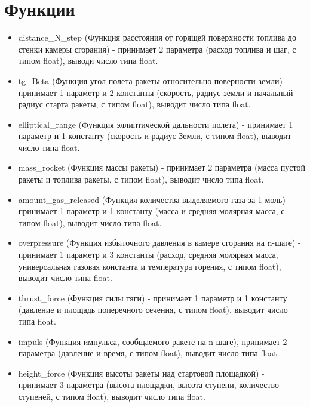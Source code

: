 \documentclass[a4paper, 12pt]{report}
\begin{document}
\section{Функции}
\begin{itemize}
    \item distance\_N\_step (Функция расстояния от горящей поверхности топлива до стенки камеры сгорания) - принимает 2 параметра (расход топлива и шаг, с типом float), выводи число типа float.
    \item tg\_Beta (Функция угол полета ракеты относительно поверности земли) - принимает 1 параметр и 2 константы (скорость, радиус земли и начальный радиус старта ракеты, с типом float), выводит число типа float.
    \item elliptical\_range (Функция эллиптической дальности полета) - принимает 1 параметр и 1 константу (скорость и радиус Земли, с типом float), выводит число типа float.
    \item mass\_rocket (Функция массы ракеты) - принимает 2 параметра (масса пустой ракеты и топлива ракеты, с типом float), выводит число типа float.
    \item amount\_gas\_released (Функция количества выделяемого газа за 1 моль) - принимает 1 параметр и 1 константу (масса и средняя молярная масса, с типом float), выводит число типа float.
    \item overpressure (Функция избыточного давления в камере сгорания на n-шаге) - принимает 1 параметр и 3 константы (расход, средняя молярная масса, универсальная газовая константа и температура горения, с типом float), выводит число типа float.
    \item thrust\_force (Функция силы тяги) - принимает 1 параметр и 1 константу (давление и площадь поперечного сечения, с типом float), выводит число типа float.
    \item impuls (Функция импульса, сообщаемого ракете на n-шаге), принимает 2 параметра (давление и время, с типом float), выводит число типа float.
    \item height\_force (Функция высоты ракеты над стартовой площадкой) - принимает 3 параметра (высота площадки, высота ступени, количество ступеней, с типом float), выводит число типа float.
\end{itemize}
\end{document}
